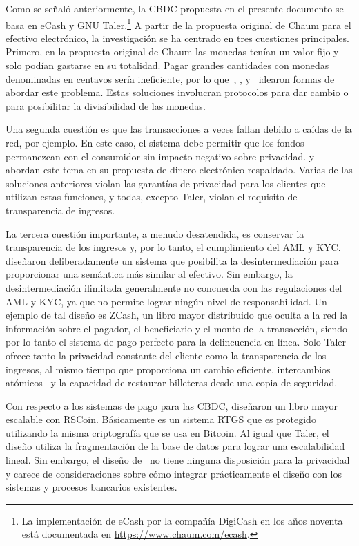 \documentclass[10pt,spanish]{article}
\begin{document}
Como se señaló anteriormente, la CBDC propuesta en el presente documento se
basa en eCash y GNU Taler.\footnote{La implementación de eCash por la compañía
DigiCash en los años noventa está documentada en
\url{https://www.chaum.com/ecash}.} A partir de la propuesta original de Chaum
para el efectivo electrónico, la investigación se ha centrado en tres
cuestiones principales. Primero, en la propuesta original de Chaum las monedas
tenían un valor fijo y solo podían gastarse en su totalidad. Pagar grandes
cantidades con monedas denominadas en centavos sería ineficiente, por lo
que~\citet{Okamoto}, \citet{Camenisch2005}, \citet{Canard} y~\citet{Dold}
idearon formas de abordar este problema. Estas soluciones involucran
protocolos para dar cambio o para posibilitar la divisibilidad de las monedas.

Una segunda cuestión es que las transacciones a veces fallan debido a
caídas de la red, por ejemplo. En este caso, el sistema debe permitir
que los fondos permanezcan con el consumidor sin impacto negativo sobre
privacidad. \citet{Camenisch2007} y~\citet{Dold} abordan este tema en
su propuesta de dinero electrónico respaldado. Varias de las soluciones
anteriores violan las garantías de privacidad para los clientes que
utilizan estas funciones, y todas, excepto Taler, violan el requisito de
transparencia de ingresos.

La tercera cuestión importante, a menudo desatendida, es conservar la
transparencia de los ingresos y, por lo tanto, el cumplimiento del AML y
KYC. \citet{Fuchsbauer} diseñaron deliberadamente un sistema que
posibilita la desintermediación para proporcionar una semántica más
similar al efectivo. Sin embargo, la desintermediación ilimitada
generalmente no concuerda con las regulaciones del AML y KYC, ya que no
permite lograr ningún nivel de responsabilidad. Un ejemplo de tal diseño
es ZCash, un libro mayor distribuido que oculta a la red la información
sobre el pagador, el beneficiario y el monto de la transacción, siendo
por lo tanto el sistema de pago perfecto para la delincuencia en línea.
Solo Taler ofrece tanto la privacidad constante del cliente como la
transparencia de los ingresos, al mismo tiempo que proporciona un cambio
eficiente, intercambios atómicos~\cite[consulte][]{Camenisch2007} y la
capacidad de restaurar billeteras desde una copia de seguridad.

Con respecto a los sistemas de pago para las CBDC, \citet{Danezis} diseñaron
un libro mayor escalable con RSCoin. Básicamente es un sistema RTGS que es
protegido utilizando la misma criptografía que se usa en Bitcoin. Al igual que
Taler, el diseño utiliza la fragmentación de la base de datos para lograr una
escalabilidad lineal. Sin embargo, el diseño de~\citet{Danezis} no tiene
ninguna disposición para la privacidad y carece de consideraciones sobre cómo
integrar prácticamente el diseño con los sistemas y procesos bancarios
existentes.
\end{document}
